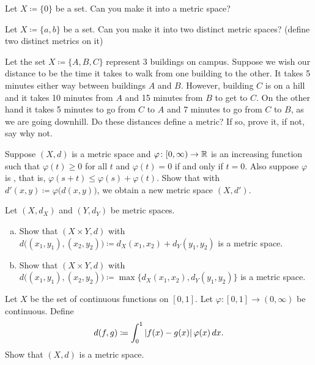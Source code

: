 \begin{exercise}
Let $X \coloneqq \{ 0 \}$ be a set.  Can you make it into a metric space?
\end{exercise}

\begin{exercise}
Let $X \coloneqq \{ a, b \}$ be a set.  Can you make it into two distinct metric
spaces?  (define two distinct metrics on it)
\end{exercise}

\begin{exercise}
Let the set $X \coloneqq \{ A, B, C \}$ represent 3 buildings on campus.  Suppose we
wish our distance to be the time it takes to walk from one building to
the other.
It takes 5 minutes either way between buildings $A$ and $B$.  However,
building $C$ is on a hill and it takes 10 minutes from $A$ and 15 minutes
from $B$ to get to $C$.  On the other hand it takes 5 minutes to go
from $C$ to $A$ and 7 minutes to go from $C$ to $B$, as we are going
downhill.  Do these distances define a metric?  If so, prove it, if not, say
why not.
\end{exercise}

\begin{exercise}
Suppose $(X,d)$ is a metric space and
$\varphi \colon [0,\infty) \to {\mathbb{R}}$ is
an increasing function such that 
$\varphi(t) \geq 0$ for all $t$ and $\varphi(t) = 0$ if and only if
$t=0$.  Also suppose $\varphi$ is \emph{},
that is, $\varphi(s+t) \leq \varphi(s)+\varphi(t)$.
Show that with $d'(x,y) \coloneqq \varphi\bigl(d(x,y)\bigr)$, we obtain a new
metric space $(X,d')$.
\end{exercise}

\begin{exercise} \label{exercise:mscross}
Let $(X,d_X)$ and $(Y,d_Y)$ be metric spaces.
\begin{enumerate}[a)]
\item
Show that $(X \times Y,d)$ with
$d\bigl( (x_1,y_1), (x_2,y_2) \bigr) \coloneqq d_X(x_1,x_2) + d_Y(y_1,y_2)$ is
a metric space.
\item
Show that $(X \times Y,d)$ with
$d\bigl( (x_1,y_1), (x_2,y_2) \bigr) \coloneqq \max \bigl\{ d_X(x_1,x_2) ,
d_Y(y_1,y_2) \bigr\}$ is
a metric space.
\end{enumerate}
\end{exercise}

\begin{exercise}
Let $X$ be the set of continuous functions on $[0,1]$.  Let $\varphi \colon
[0,1] \to (0,\infty)$ be continuous.  Define
\begin{equation*}
d(f,g) \coloneqq \int_0^1 \left\lvert {f(x)-g(x)} \right\rvert\varphi(x)\,dx .
\end{equation*}
Show that $(X,d)$ is a metric space.
\end{exercise}


